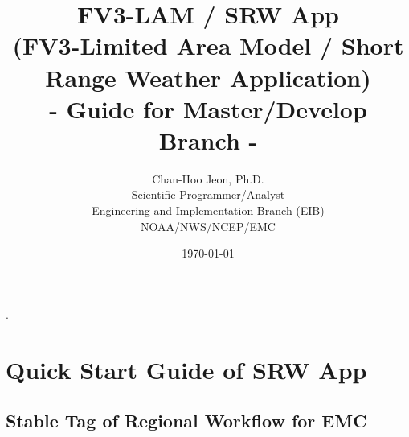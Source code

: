 \documentclass[11pt,fleqn]{report}              %
\title{\Huge{\bf FV3-LAM / SRW App} \\ {\Large (FV3-Limited Area Model / Short Range Weather Application)} \\[2cm] {\huge - Guide for Master/Develop Branch -} \\[3.5cm]}  %
\author{ \Large{Chan-Hoo Jeon, Ph.D.}  \\ \vspace{1.0cm}
         \large{Scientific Programmer/Analyst}  \\ \vspace{1.0cm}
         \large{Engineering and Implementation Branch (EIB)} \\ \vspace{0.5cm}
         \large{NOAA/NWS/NCEP/EMC} \\
          }            %
\date{\today}                           %
\begin{document}



\maketitle                              %

\onehalfspacing

\tableofcontents                        %


\setlength\parindent{0pt}. %





\chapter{Quick Start Guide of SRW App}               
\label{chpt:quick_start}

\section{Stable Tag of Regional Workflow for EMC}
\label{sec:quick_stable_tag_emc}
\end{document}
